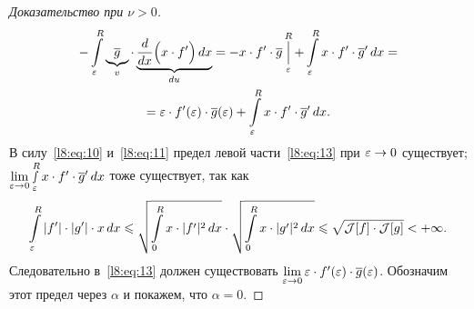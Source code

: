 \begin{proof}[Доказательство при $\nu>0$]
\begin{multline}
		-\int\limits_{\varepsilon}^R\underbrace{\overline{g}}_{v}\cdot\underbrace{\frac{d}{dx}\Big(x\cdot f'\Big)\,dx}_{du}=-x\cdot f'\cdot\overline{g}\mathop{\Big|}\limits_{\varepsilon}^R+\int\limits_{\varepsilon}^R x\cdot f'\cdot\overline{g}'\,dx=\\=\varepsilon\cdot f'(\varepsilon)\cdot\overline{g}(\varepsilon)+\int\limits_{\varepsilon}^R x\cdot f'\cdot\overline{g}'\,dx.
	\end{multline}
	В силу~\eqref{l8:eq:10} и~\eqref{l8:eq:11} предел левой части~\eqref{l8:eq:13} при $\varepsilon\to0$ существует; $\lim\limits_{\varepsilon\to0}\smallint\limits_{\varepsilon}^R x\cdot f'\cdot\overline{g}'\,dx$ тоже существует, так как 
	\begin{equation*}
		\int\limits_{\varepsilon}^{R}|f'|\cdot|g'|\cdot x\,dx\leqslant\sqrt{\int\limits_{0}^{R}x\cdot|f'|^2\,dx}\cdot\sqrt{\int\limits_{0}^{R}x\cdot|g'|^2\,dx}\leqslant\sqrt{\mathcal{J}[f]\cdot\mathcal{J}[g]}<+\infty.
	\end{equation*}
	Следовательно в~\eqref{l8:eq:13} должен существовать $\lim\limits_{\varepsilon\to0}\varepsilon\cdot f'(\varepsilon)\cdot\overline{g}(\varepsilon)$. Обозначим этот предел через $\alpha$ и покажем, что $\alpha=0$.
	

\end{proof}
